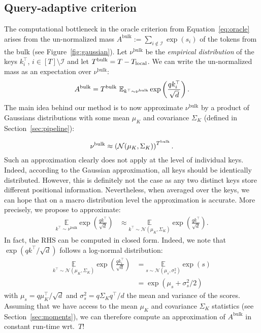 \subsection{Query-adaptive criterion}
The computational bottleneck in the oracle criterion from Equation~\eqref{eq:oracle} arises from the un-normalized mass $A^{\text{bulk}} := \sum_{i \notin \mathcal I} \exp(s_i)$ of the tokens from the bulk (see Figure~\ref{fig:gaussian}).  Let $\nu^{\text{bulk}}$ be the \textit{empirical distribution} of the keys $k_i^\top$, $i \in [T] \setminus \mathcal I$ and let $T^{\text{bulk}}=T- T_{\text{local}}$. We can write the un-normalized mass as an expectation over $\nu^{\text{bulk}}$:
\begin{equation}
    A^{\text{bulk}}= T^{\text{bulk}}~\mathbb E_{k^\top \sim \nu^{\text{bulk}}} \exp\left(\frac{qk_i^\top }{\sqrt{d}}\right). 
\end{equation}
The main idea behind our method is to now approximate $\nu^{\text{bulk}}$ by a product of Gaussians distributions with some mean $\mu_K$ and covariance $\Sigma_K$ (defined in Section~\ref{sec:pipeline}):



\begin{equation}
    \nu^{\text{bulk}} \approx \left(\mathcal  N(\mu_K, \Sigma_K)  \right)^{T^{\text{bulk}}}.
\end{equation}
Such an approximation clearly does not apply at the level of individual keys. Indeed, according to the Gaussian approximation, all keys should be identically distributed. However, this is definitely not the case as any two distinct keys store different positional information. Nevertheless, when averaged over the keys, we can hope that on a macro distribution level the approximation is accurate. More precisely, we propose to approximate:
\begin{align}
    \underset{k^\top \sim \nu^{\text{bulk}}}{\mathbb E} \exp\left(\frac{qk^\top}{\sqrt{d}}\right) &\approx \underset{k^\top \sim \mathcal N(\mu_K, \Sigma_K)}{ \mathbb{E}} \exp\left(\frac{q k^\top}{\sqrt{d}}\right). \label{eq:gaussianapprox}
\end{align}
In fact, the RHS can be computed in closed form. Indeed, we note that $\exp(q k^\top/\sqrt{d})$ follows a log-normal distribution:
\begin{align}
        \underset{k^\top \sim \mathcal N(\mu_K, \Sigma_K)}{ \mathbb{E}} \exp\left(\frac{q k_i^\top}{\sqrt{d}}\right) &=   \underset{s\sim \mathcal N(\mu_s, \sigma^2_s)}{ \mathbb{E}} \exp(s)  \nonumber\\
        &= \exp(\mu_s + \sigma_s^2/2)
        \label{eq:approx}
\end{align}
with $\mu_s = q \mu_K^\top/\sqrt{d}$ and $\sigma^2_s = q \Sigma_K q^\top /d$ the mean and variance of the scores. 
Assuming that we have access to the mean $\mu_K$ and covariance $\Sigma_K$ statistics (see Section~\ref{sec:moments}), we can therefore compute an approximation of $ A^{\text{bulk}}$ in constant run-time wrt.~$T$! 

